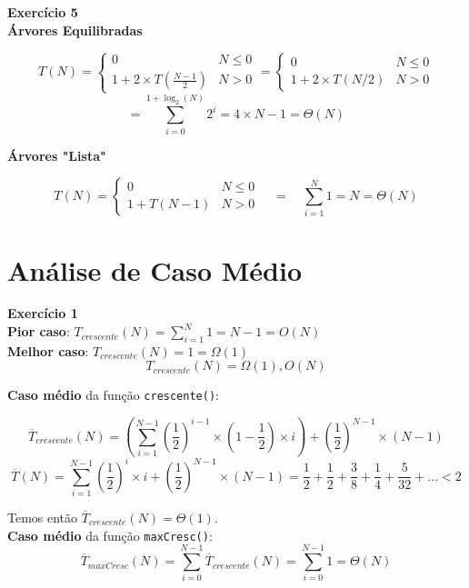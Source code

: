 \documentclass[a4paper,11pt]{article}
\begin{document}
	\noindent \textbf{Exercício 5}\\
	
	\noindent \textbf{Árvores Equilibradas}
	
	\[
		T(N) = 
		\begin{cases}
			0 & N \leq 0 \\
			1 + 2 \times T(\frac{N-1}{2}) & N > 0
		\end{cases}
		=
		\begin{cases}
			0 & N \leq 0 \\
			1 + 2 \times T(N/2) & N > 0
		\end{cases}
	\]
	\[
		= \sum_{i=0}^{1 + \log_2(N)} 2^i = 4 \times N - 1 = \Theta(N)
	\]
	
	\noindent \textbf{Árvores "Lista"}
	
	\[
	T(N) = 
	\begin{cases}
		0 & N \leq 0 \\
		1 + T(N - 1) & N > 0
	\end{cases}
	\quad = \quad \sum_{i=1}^{N} 1 = N = \Theta(N)
	\]
	
	
	
	\section{Análise de Caso Médio}
	
	\noindent \textbf{Exercício 1}\\
	
	\noindent \textbf{Pior caso}: $ T_{crescente}(N) = \sum_{i=1}^{N} 1 = N - 1 = O(N) $\\
	
	\noindent \textbf{Melhor caso}: $ T_{crescente}(N) = 1 = \Omega(1) $\\
	\[
		T_{crescente}(N) = \Omega(1), O(N)
	\]
	
	\noindent \textbf{Caso médio} da função \texttt{crescente()}:
	
	\[
		\overline{T}_{crescente}(N) = (\sum_{i=1}^{N-1} (\frac{1}{2})^{i-1} \times (1-\frac{1}{2}) \times i) + (\frac{1}{2})^{N-1} \times (N - 1)
	\]
	\[
		\overline{T}(N) = \sum_{i=1}^{N-1} (\frac{1}{2})^i \times i + (\frac{1}{2})^{N-1} \times (N - 1) = \frac{1}{2} + \frac{1}{2} + \frac{3}{8} + \frac{1}{4} + \frac{5}{32} + ... < 2
	\]
	
	\noindent Temos então $ \overline{T}_{crescente}(N) = \Theta(1) $.\\
	
	\noindent \textbf{Caso médio} da função \texttt{maxCresc()}:
	\[
		\overline{T}_{maxCresc}(N) = \sum_{i=0}^{N-1} \overline{T}_{crescente}(N) = \sum_{i=0}^{N-1} 1 = \Theta(N)
	\]
	
\end{document}

